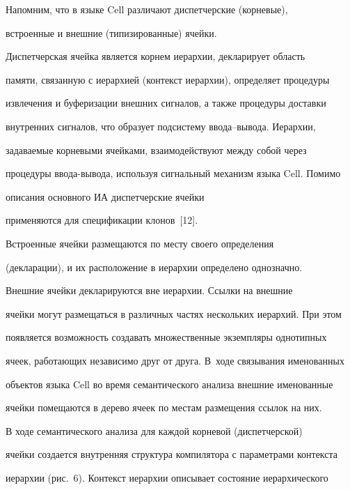      Напомним, что в языке Cell различают диспетчерские (корневые), 


встроенные и внешние (типизированные) ячейки.


     


     Диспетчерская ячейка является корнем иерархии, декларирует область 


памяти, связанную с иерархией (контекст иерархии), определяет процедуры 


извлечения и буферизации внешних сигналов, а также процедуры доставки 


внутренних сигналов, что образует подсистему вво\-да--вы\-во\-да. Иерархии, 


задаваемые корневыми ячейками, взаимодействуют между собой через 


процедуры ввода-вывода, используя сигнальный механизм языка Cell. Помимо 


описания основного ИА диспетчерские ячейки 


применяются для спецификации клонов~[12].


      


      Встроенные ячейки размещаются по месту своего определения 


(декларации), и их расположение в иерархии определено однозначно.


      


      Внешние ячейки декларируются вне иерархии. Ссылки на внешние 


ячейки могут размещаться в различных частях нескольких иерархий. При этом 


появляется возможность создавать множественные экземпляры однотипных 


ячеек, работающих независимо друг от друга. В~ходе связывания именованных 


объектов языка Cell во время семантического анализа внешние именованные 


ячейки помещаются в дерево ячеек по местам размещения ссылок на них.


     


     В ходе семантического анализа для каждой корневой (диспетчерской) 


ячейки создается внутренняя структура компилятора с параметрами контекста 


иерархии (рис.~6). Контекст иерархии описывает состояние иерархического 


